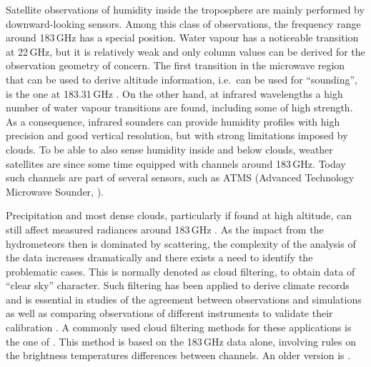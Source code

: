 \documentclass[amt, manuscript]{copernicus}
\begin{document}


\introduction
%
Satellite observations of humidity inside the troposphere are mainly performed
by downward-looking sensors. Among this class of observations, the frequency
range around 183\,GHz has a special position. Water vapour has a noticeable
transition at 22\,GHz, but it is relatively weak and only column values can be
derived \citep[e.g.][]{schluessel1990atmospheric} for the observation geometry
of concern. The first transition in the microwave region that can be used to
derive altitude information, i.e.\ can be used for ``sounding'', is the one at
183.31\,GHz \citep{kakar1983retrieval,wang1983profiling}. On the other hand, at
infrared wavelengths a high number of water vapour transitions are found,
including some of high strength. As a consequence, infrared sounders can
provide humidity profiles with high precision and good vertical resolution, but
with strong limitations imposed by clouds. To be able to also sense humidity
inside and below clouds, weather satellites are since some time equipped with
channels around 183\,GHz. Today such channels are part of several sensors, such
as ATMS (Advanced Technology Microwave Sounder, \citet{weng2012introduction}).

Precipitation and most dense clouds, particularly if found at high altitude, can
still affect measured radiances around 183\,GHz
\citep[e.g.][]{bennartz2003sensitivity}. As the impact from the hydrometeors
then is dominated by scattering, the complexity of the analysis of the data
increases dramatically and there exists a need to identify the problematic
cases. This is normally denoted as cloud filtering, to obtain data of ``clear
sky'' character. Such filtering has been applied to derive climate records
\citep{lang2020new} and is essential in studies of the agreement between
observations and simulations \citep{brogniez2016review} as well as 
comparing observations of different instruments to validate their calibration
\citep{john2013assessment,moradi:retri:15,berg2016intercalibration}. A commonly
used cloud filtering methods for these applications is the one of
\citet{buehler:aclou:07}. This method is based on the 183\,GHz data alone,
involving rules on the brightness temperatures differences between channels. An
older version is \citet{burns1997effects}.
\end{document}
